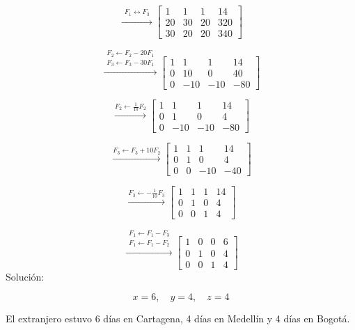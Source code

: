 \documentclass[12pt,letterpaper]{article}
\begin{document}
\begin{enumerate}
\[
\xrightarrow{\substack{F_1 \leftrightarrow F_3}}
\left[
\begin{array}{ccc|c}
1 & 1 & 1 & 14 \\
20 & 30 & 20 & 320 \\
30 & 20 & 20 & 340
\end{array}
\right]
\]

\[
\xrightarrow{\substack{F_2 \leftarrow F_2 - 20F_1\\ F_3 \leftarrow F_3 - 30F_1}}
\left[
\begin{array}{ccc|c}
1 & 1 & 1 & 14 \\
0 & 10 & 0 & 40 \\
0 & -10 & -10 & -80
\end{array}
\right]
\]

\[
\xrightarrow{F_2 \leftarrow \frac{1}{10}F_2}
\left[
\begin{array}{ccc|c}
1 & 1 & 1 & 14 \\
0 & 1 & 0 & 4 \\
0 & -10 & -10 & -80
\end{array}
\right]
\]

\[
\xrightarrow{F_3 \leftarrow F_3 + 10F_2}
\left[
\begin{array}{ccc|c}
1 & 1 & 1 & 14 \\
0 & 1 & 0 & 4 \\
0 & 0 & -10 & -40
\end{array}
\right]
\]

\[
\xrightarrow{F_3 \leftarrow -\frac{1}{10}F_3}
\left[
\begin{array}{ccc|c}
1 & 1 & 1 & 14 \\
0 & 1 & 0 & 4 \\
0 & 0 & 1 & 4
\end{array}
\right]
\]

\[
\xrightarrow{\substack{F_1 \leftarrow F_1 - F_3\\ F_1 \leftarrow F_1 - F_2}}
\left[
\begin{array}{ccc|c}
1 & 0 & 0 & 6 \\
0 & 1 & 0 & 4 \\
0 & 0 & 1 & 4
\end{array}
\right]
\]
\newpage
Solución:

\[
x = 6, \quad y = 4, \quad z = 4
\]

El extranjero estuvo 6 días en Cartagena, 4 días en Medellín y 4 días en Bogotá.

\end{enumerate}
\end{document}
